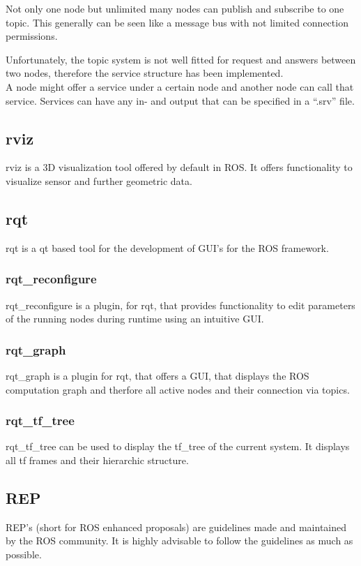 Not only one node but unlimited many nodes can publish and subscribe to one topic. This generally can be seen like a message bus with not limited connection permissions\cite{rosconcepts}.

Unfortunately, the topic system is not well fitted for request and answers between two nodes, therefore the service structure has been implemented.\\ 
A node might offer a service under a certain node and another node can call that service. Services can have any in- and output that can be specified in a ``.srv'' file\cite{rosconcepts}.

\subsection{rviz}
rviz is a 3D visualization tool offered by default in ROS. It offers functionality to visualize sensor and further geometric data.\\
\subsection{rqt}
rqt is a qt based tool for the development of GUI's for the ROS framework\cite{rqt}.
\subsubsection{rqt\_reconfigure}
	rqt\_reconfigure is a plugin, for rqt, that provides functionality to edit parameters of the running nodes during runtime using an intuitive GUI\cite{rqtrecon}.
	
\subsubsection{rqt\_graph}

	rqt\_graph is a plugin for rqt, that offers a GUI, that displays the ROS computation graph and therfore all active nodes and their connection via topics\cite{rqtgraph}.
\subsubsection{rqt\_tf\_tree}
	rqt\_tf\_tree can be used to display the tf\_tree of the current system. It displays all tf frames and their hierarchic structure\cite{rqttftree}.
\subsection{REP}
REP's (short for ROS enhanced proposals) are guidelines made and maintained by the ROS community. It is highly advisable to follow the guidelines as much as possible.

